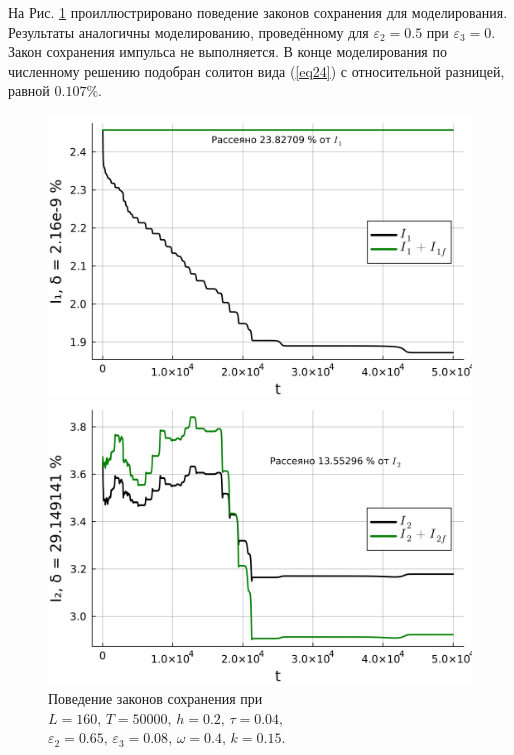 \documentclass[14pt,a4paper]{extreport}
\begin{document}
			На Рис. \ref{fig340-7} проиллюстрировано поведение законов сохранения для моделирования. Результаты аналогичны моделированию, проведённому для \(\varepsilon_{2}=0.5\) при \(\varepsilon_{3}=0\). Закон сохранения импульса не выполняется. В конце моделирования по численному решению подобран солитон вида (\ref{eq24}) с относительной разницей, равной \(0.107\%\).
			\begin{figure}[H] %
				\begin{center}
					\begin{minipage}[h]{0.48\linewidth}
						\includegraphics[width=1\linewidth]{fig69.png}
					\end{minipage}
					\hfill
					\begin{minipage}[h]{0.48\linewidth}
						\includegraphics[width=1\linewidth]{fig70.png}
					\end{minipage}
				\end{center}
				\caption{Поведение законов сохранения при
				\(L=160,\, T=50000,\, h=0.2,\, \tau=0.04,\)
				\(\varepsilon_{2}=0.65,\,\varepsilon_{3}=0.08,\, \omega=0.4,\, k=0.15\).}
				\label{fig340-7}
			\end{figure}
\end{document}
